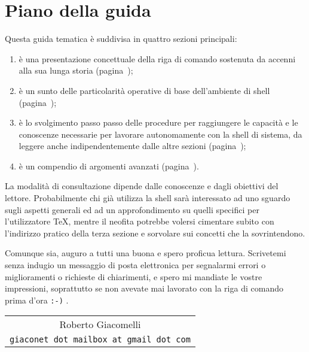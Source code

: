 
%
%
%
\chapter{Piano della guida}

Questa guida tematica è suddivisa in quattro sezioni principali:
\begin{enumerate}
\item è una presentazione concettuale della riga di comando sostenuta da accenni
alla sua lunga storia (pagina~\pageref{chapConsole});

\item è un sunto delle particolarità operative di base dell'ambiente di shell
(pagina~\pageref{chapShell});

\item è lo svolgimento passo passo delle procedure per raggiungere le capacità e
le conoscenze necessarie per lavorare autonomamente con la shell di sistema, da
leggere anche indipendentemente dalle altre sezioni (pagina~\pageref{chapEser});

\item è un compendio di argomenti avanzati (pagina~\pageref{chapAvanz}).
\end{enumerate}

La modalità di consultazione dipende dalle conoscenze e dagli obiettivi del
lettore. Probabilmente chi già utilizza la shell sarà interessato ad uno sguardo
sugli aspetti generali ed ad un approfondimento su quelli specifici per
l'utilizzatore \TeX, mentre il neofita potrebbe volersi cimentare subito con
l'indirizzo pratico della terza sezione e sorvolare sui concetti che la
sovrintendono.

Comunque sia, auguro a tutti una buona e spero proficua lettura. Scrivetemi
senza indugio un messaggio di posta elettronica per segnalarmi errori o
miglioramenti o richieste di chiarimenti, e spero mi mandiate le vostre
impressioni, soprattutto se non avevate mai lavorato con la riga di comando
prima d'ora \texttt{:-)} .

\medskip
\hfill\begin{tabular}{c}
Roberto Giacomelli\\
\texttt{giaconet dot mailbox at gmail dot com}\\
\end{tabular}
